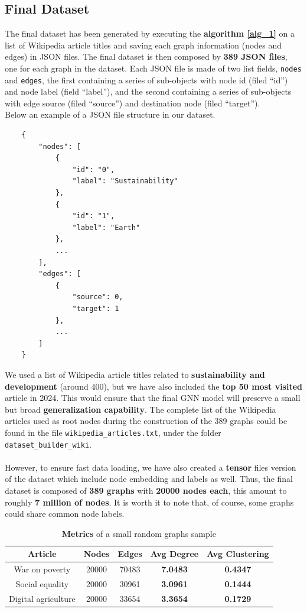 \documentclass[11pt]{article}
\begin{document}
	\subsection{Final Dataset}
	The final dataset has been generated by executing the \textbf{algorithm \ref{alg_1}} on a list of Wikipedia article titles and saving each graph information (nodes and edges) in JSON files. The final dataset is then composed by \textbf{389 JSON files}, one for each graph in the dataset. Each JSON file is made of two list fields, \texttt{nodes} and \texttt{edges}, the first containing a series of sub-objects with node id (filed ``id'') and node label (field ``label''), and the second containing a series of sub-objects with edge source (filed ``source'') and destination node (filed ``target'').\\
	Below an example of a JSON file structure in our dataset.
	\begin{verbatim}
	{	
		"nodes": [
			{
				"id": "0",
				"label": "Sustainability"
			},
			{
				"id": "1",
				"label": "Earth"
			},
			...
		],
		"edges": [
			{
				"source": 0,
				"target": 1
			},
			...
		]
	}
	\end{verbatim}
	We used a list of Wikipedia article titles related to \textbf{sustainability and development} (around $400$), but we have also included the \textbf{top 50 most visited} article in 2024.
	This would ensure that the final GNN model will preserve a small but broad \textbf{generalization capability}.
	The complete list of the Wikipedia articles used as root nodes during the construction of the 389 graphs could be found in the file \texttt{wikipedia\_articles.txt}, under the folder \texttt{dataset\_builder\_wiki}.\\\\
	However, to ensure fast data loading, we have also created a \textbf{tensor} files version of the dataset which include node embedding and labels as well.
	Thus, the final dataset is composed of \textbf{389 graphs} with \textbf{20000 nodes each}, this amount to roughly \textbf{7 million of nodes}. It is worth it to note that, of course, some graphs could share common node labels.\\
	
	\begin{table}[h!]
		\label{table_0}
		\centering
		\begin{tabular}{ccccc}
			\toprule
			Article & Nodes & Edges & \textbf{Avg Degree} & \textbf{Avg Clustering} \\
			\midrule
			War on poverty & 20000 & 70483 & \textbf{7.0483} & \textbf{0.4347} \\
			Social equality & 20000 & 30961 & \textbf{3.0961} & \textbf{0.1444} \\
			Digital agriculture & 20000 & 33654 & \textbf{3.3654} & \textbf{0.1729} \\
			\bottomrule
		\end{tabular}
		\caption{\textbf{Metrics} of a small random graphs sample}
	\end{table}
	
\end{document}
